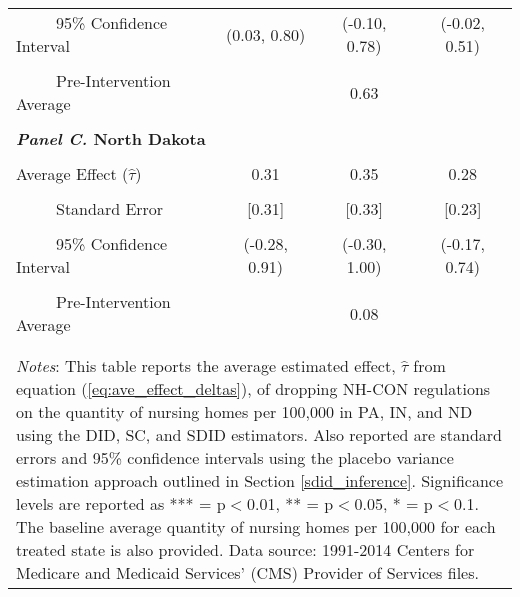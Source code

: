 \documentclass[../Main.tex]{subfiles}
\begin{document}
\begin{table}[htbp]
\begin{tabular}{l*{3}{c}}
\\[-2ex]
\multicolumn{1}{l}{\ \ \ \ \ 95\% Confidence Interval}&   \multicolumn{1}{c}{(0.03, 0.80)}&   \multicolumn{1}{c}{(-0.10, 0.78)}&   \multicolumn{1}{c}{(-0.02, 0.51)}\\
\\[-2ex]
\multicolumn{1}{l}{\ \ \ \ \ Pre-Intervention Average}&   \multicolumn{3}{c}{0.63}\\
\\[-.1ex]
\multicolumn{4}{l}{\textbf{\textit{Panel C.} North Dakota}}\\
\\[-1.5ex]
\multicolumn{1}{l}{Average Effect ($\hat{\tau}$)}&   \multicolumn{1}{c}{0.31}&   \multicolumn{1}{c}{0.35}&  \multicolumn{1}{c}{0.28}\\
\\[-2ex]
\multicolumn{1}{l}{\ \ \ \ \ Standard Error}  &\multicolumn{1}{c}{[0.31]}&\multicolumn{1}{c}{[0.33]}&\multicolumn{1}{c}{[0.23]}\\
\\[-2ex]
\multicolumn{1}{l}{\ \ \ \ \ 95\% Confidence Interval}&   \multicolumn{1}{c}{(-0.28, 0.91)}&   \multicolumn{1}{c}{(-0.30, 1.00)}&   \multicolumn{1}{c}{(-0.17, 0.74)}\\
\\[-2ex]
\multicolumn{1}{l}{\ \ \ \ \ Pre-Intervention Average}&   \multicolumn{3}{c}{0.08}\\
\\[-.1ex]
\hline\hline
\\[-2ex]
\multicolumn{4}{p{.75\linewidth}}{\footnotesize \textit{Notes}: This table reports the average estimated effect, $\hat{\tau}$ from equation (\ref{eq:ave_effect_deltas}), of dropping NH-CON regulations on the quantity of nursing homes per 100,000 in PA, IN, and ND using the DID, SC, and SDID estimators. Also reported are standard errors and 95\% confidence intervals using the placebo variance estimation approach outlined in Section \ref{sdid_inference}. Significance levels are reported as *** = p$<$0.01, ** = p$<$0.05, * = p$<$0.1. The baseline average quantity of nursing homes per 100,000 for each treated state is also provided. Data source: 1991-2014 Centers for Medicare and Medicaid Services’ (CMS) Provider of Services files.}
\end{tabular}
\end{table}
\vfill
\clearpage
\end{document}
